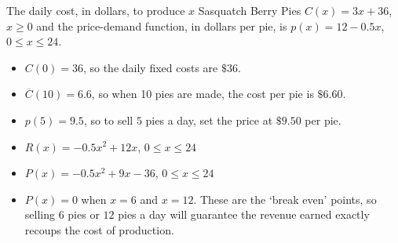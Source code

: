 {The daily cost, in dollars, to produce $x$ Sasquatch Berry Pies $C(x) = 3x + 36$, $x \geq 0$ and the price-demand function, in  dollars per pie,  is $p(x) = 12-0.5x$, $0 \leq x \leq 24$.}
{\begin{itemize}

\item  $C(0) = 36$, so the daily fixed costs are $\$36$.

\item  $\overline{C}(10) = 6.6$, so when 10 pies are made, the cost per pie is $\$6.60$.

\item  $p(5) = 9.5$, so to sell $5$ pies a day, set the price at $\$9.50$  per pie.

\item $R(x) = -0.5 x^2 + 12x$, $0 \leq x \leq 24$

\item  $P(x) = -0.5 x^2+9x-36$, $0 \leq x \leq 24$

\item  $P(x) = 0$ when $x = 6$ and $x=12$.  These are the `break even' points, so selling $6$ pies or $12$ pies a day will guarantee the revenue earned exactly recoups the cost of production.

\end{itemize}
}